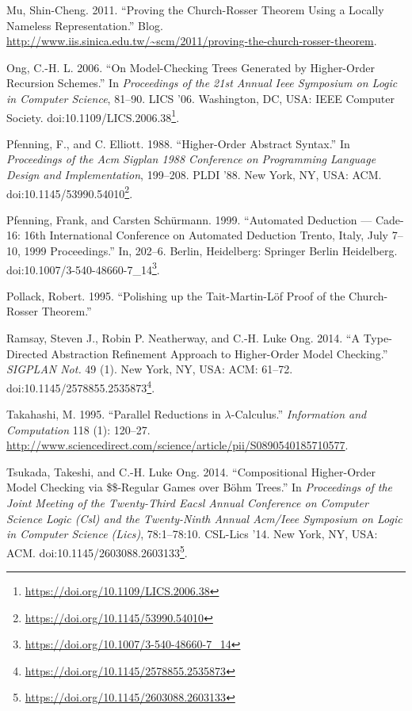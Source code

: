 \documentclass[a4paper, 12pt, twoside]{style/ociamthesis}
\theoremstyle{plain}
\theoremstyle{definition}
\theoremstyle{remark}
\renewcommand{\href}[2]{#2\footnote{\url{#1}}}
\begin{document}
\hypertarget{ref-shing-cheng}{}
Mu, Shin-Cheng. 2011. ``Proving the Church-Rosser Theorem Using a
Locally Nameless Representation.'' Blog.
\url{http://www.iis.sinica.edu.tw/~scm/2011/proving-the-church-rosser-theorem}.

\hypertarget{ref-ong06}{}
Ong, C.-H. L. 2006. ``On Model-Checking Trees Generated by Higher-Order
Recursion Schemes.'' In \emph{Proceedings of the 21st Annual Ieee
Symposium on Logic in Computer Science}, 81--90. LICS '06. Washington,
DC, USA: IEEE Computer Society.
doi:\href{https://doi.org/10.1109/LICS.2006.38}{10.1109/LICS.2006.38}.

\hypertarget{ref-pfenning88}{}
Pfenning, F., and C. Elliott. 1988. ``Higher-Order Abstract Syntax.'' In
\emph{Proceedings of the Acm Sigplan 1988 Conference on Programming
Language Design and Implementation}, 199--208. PLDI '88. New York, NY,
USA: ACM.
doi:\href{https://doi.org/10.1145/53990.54010}{10.1145/53990.54010}.

\hypertarget{ref-pfenning99}{}
Pfenning, Frank, and Carsten Schürmann. 1999. ``Automated Deduction ---
Cade-16: 16th International Conference on Automated Deduction Trento,
Italy, July 7--10, 1999 Proceedings.'' In, 202--6. Berlin, Heidelberg:
Springer Berlin Heidelberg.
doi:\href{https://doi.org/10.1007/3-540-48660-7_14}{10.1007/3-540-48660-7\_14}.

\hypertarget{ref-pollack95}{}
Pollack, Robert. 1995. ``Polishing up the Tait-Martin-Löf Proof of the
Church-Rosser Theorem.''

\hypertarget{ref-ramsay14}{}
Ramsay, Steven J., Robin P. Neatherway, and C.-H. Luke Ong. 2014. ``A
Type-Directed Abstraction Refinement Approach to Higher-Order Model
Checking.'' \emph{SIGPLAN Not.} 49 (1). New York, NY, USA: ACM: 61--72.
doi:\href{https://doi.org/10.1145/2578855.2535873}{10.1145/2578855.2535873}.

\hypertarget{ref-takahashi95}{}
Takahashi, M. 1995. ``Parallel Reductions in \(\lambda\)-Calculus.''
\emph{Information and Computation} 118 (1): 120--27.
\url{http://www.sciencedirect.com/science/article/pii/S0890540185710577}.

\hypertarget{ref-tsukada14}{}
Tsukada, Takeshi, and C.-H. Luke Ong. 2014. ``Compositional Higher-Order
Model Checking via \$\$-Regular Games over Böhm Trees.'' In
\emph{Proceedings of the Joint Meeting of the Twenty-Third Eacsl Annual
Conference on Computer Science Logic (Csl) and the Twenty-Ninth Annual
Acm/Ieee Symposium on Logic in Computer Science (Lics)}, 78:1--78:10.
CSL-Lics '14. New York, NY, USA: ACM.
doi:\href{https://doi.org/10.1145/2603088.2603133}{10.1145/2603088.2603133}.

\end{document}
